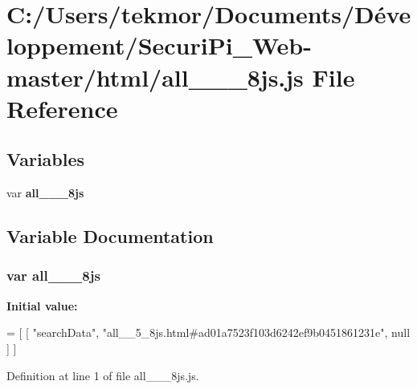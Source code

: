 \section{C\+:/\+Users/tekmor/\+Documents/\+Développement/\+Securi\+Pi\+\_\+\+Web-\/master/html/all\+\_\+\+\_\+\_\+8js.js File Reference}
\label{all____5__8js_8js}
\subsection*{Variables}
\begin{DoxyCompactItemize}
\item 
var {\bf all\+\_\+\+\_\+\_\+8js}
\end{DoxyCompactItemize}


\subsection{Variable Documentation}
\subsubsection[{all\+\_\+\+\_\+5\+\_\+8js}]{\setlength{\rightskip}{0pt plus 5cm}var all\+\_\+\+\_\+\_\+8js}\label{all____5__8js_8js_ae6d4e78c3e7768166dd273e4a2d2cd08}
{\bfseries Initial value\+:}
\begin{DoxyCode}
=
[
    [ \textcolor{stringliteral}{"searchData"}, \textcolor{stringliteral}{"all\_\_5\_8js.html#ad01a7523f103d6242ef9b0451861231e"}, null ]
]
\end{DoxyCode}


Definition at line 1 of file all\+\_\+\+\_\+\_\+8js.\+js.

